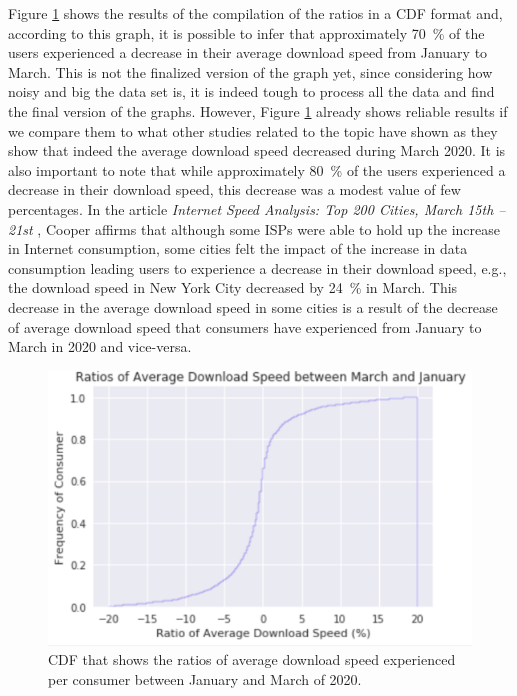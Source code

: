 \documentclass[conference]{IEEEtran}
\begin{document}
Figure \ref{fig:downloadspeed2020} shows the results of the compilation of the ratios in a CDF format and, according to this graph, it is possible to infer that approximately \SI{70}{\percent} of the users experienced a decrease in their average download speed from January to March. This is not the finalized version of the graph yet, since considering how noisy and big the data set is, it is indeed tough to process all the data and find the final version of the graphs. However, Figure \ref{fig:downloadspeed2020} already shows reliable results if we compare them to what other studies related to the topic have shown as they show that indeed the average download speed decreased during March 2020. It is also important to note that while approximately \SI{80}{\percent} of the users experienced a decrease in their download speed, this decrease was a modest value of few percentages. In the article \textit{ Internet Speed Analysis: Top 200 Cities, March 15th – 21st} \cite{cooper}, Cooper affirms that although some ISPs were able to hold up the increase in  Internet consumption, some cities felt the impact of the increase in data consumption leading users to experience a decrease in their download speed, e.g., the download speed in New York City decreased by \SI{24}{\percent} in March. This decrease in the average download speed in some cities is a result of the decrease of average download speed that consumers have experienced from January to March in 2020 and vice-versa. 

\begin{figure}[h!]
\centering
\includegraphics[width=1.0\linewidth]{downspeed.PNG}
\caption{CDF that shows the ratios of average download speed experienced per consumer between January and March of 2020.}
\label{fig:downloadspeed2020}
\end{figure}
\end{document}
